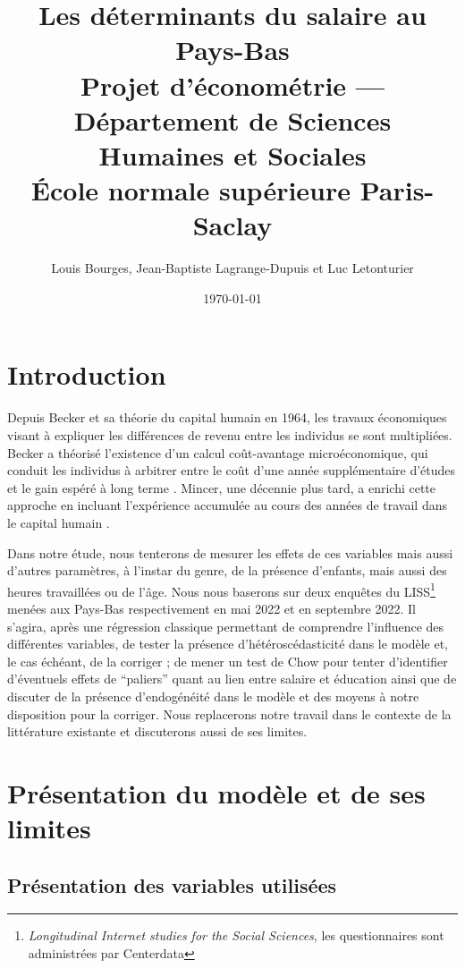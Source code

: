\documentclass[a4paper, french, 11 pt]{article}\usepackage[]{graphicx}\usepackage[]{xcolor}
\title{Les déterminants du salaire au Pays-Bas\\
\vspace{0,5cm}
{\normalsize Projet d'économétrie --- Département de Sciences Humaines et Sociales\\
\vspace{0,5cm}
École normale supérieure Paris-Saclay}}
\author{\normalsize Louis Bourges, Jean-Baptiste Lagrange-Dupuis et Luc Letonturier}
\date{\normalsize\today}
\begin{document}
\maketitle

\section*{Introduction}

Depuis Becker et sa théorie du capital humain en 1964, les travaux économiques visant à expliquer les différences de revenu entre les individus se sont multipliées. Becker a théorisé l’existence d’un calcul coût-avantage microéconomique, qui conduit les individus à arbitrer entre le coût d’une année supplémentaire d’études et le gain espéré à long terme \parencite{becker1964}. Mincer, une décennie plus tard, a enrichi cette approche en incluant l’expérience accumulée au cours des années de travail dans le capital humain \parencite{mincer1974}.

Dans notre étude, nous tenterons de mesurer les effets de ces variables mais aussi d’autres paramètres, à l’instar du genre, de la présence d’enfants, mais aussi des heures travaillées ou de l’âge. Nous nous baserons sur deux enquêtes du LISS\footnote{\textit{Longitudinal Internet studies for the Social Sciences}, les questionnaires sont administrées par Centerdata} menées aux Pays-Bas respectivement en mai 2022 et en septembre 2022. Il s’agira, après une régression classique permettant de comprendre l’influence des différentes variables, de tester la présence d’hétéroscédasticité dans le modèle et, le cas échéant, de la corriger ; de mener un test de Chow pour tenter d'identifier d'éventuels effets de “paliers” quant au lien entre salaire et éducation ainsi que de discuter de la présence d’endogénéité dans le modèle et des moyens à notre disposition pour la corriger. Nous replacerons notre travail dans le contexte de la littérature existante et discuterons aussi de ses limites.



\section{Présentation du modèle et de ses limites}

\subsection{Présentation des variables utilisées}
\end{document}
